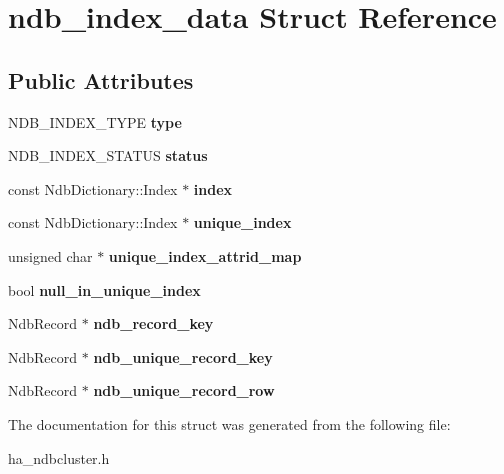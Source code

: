 \hypertarget{structndb__index__data}{}\section{ndb\+\_\+index\+\_\+data Struct Reference}
\label{structndb__index__data}
\subsection*{Public Attributes}
\begin{DoxyCompactItemize}
\item 
\mbox{\label{structndb__index__data_a3dbfb860106adeb20ff94dc96f12f490}} 
N\+D\+B\+\_\+\+I\+N\+D\+E\+X\+\_\+\+T\+Y\+PE {\bfseries type}
\item 
\mbox{\label{structndb__index__data_a23e562bc1549fb58196c704acba2a59f}} 
N\+D\+B\+\_\+\+I\+N\+D\+E\+X\+\_\+\+S\+T\+A\+T\+US {\bfseries status}
\item 
\mbox{\label{structndb__index__data_ac62a8cd0e83bcbac5164184ba6233a3a}} 
const Ndb\+Dictionary\+::\+Index $\ast$ {\bfseries index}
\item 
\mbox{\label{structndb__index__data_a0356a02115f2e176c3e1bf0da18e6a58}} 
const Ndb\+Dictionary\+::\+Index $\ast$ {\bfseries unique\+\_\+index}
\item 
\mbox{\label{structndb__index__data_a7b33611f8398053f1c9dcfd75b4f3523}} 
unsigned char $\ast$ {\bfseries unique\+\_\+index\+\_\+attrid\+\_\+map}
\item 
\mbox{\label{structndb__index__data_ac1a04ce2d4eda90074f60c2b00ad0938}} 
bool {\bfseries null\+\_\+in\+\_\+unique\+\_\+index}
\item 
\mbox{\label{structndb__index__data_a6c5fc9bc4c229b27e2cb76558ca1b5a8}} 
Ndb\+Record $\ast$ {\bfseries ndb\+\_\+record\+\_\+key}
\item 
\mbox{\label{structndb__index__data_a2b3a3148f82971344e42eb64996eea5c}} 
Ndb\+Record $\ast$ {\bfseries ndb\+\_\+unique\+\_\+record\+\_\+key}
\item 
\mbox{\label{structndb__index__data_a3315594fe406e8cf98a64ea605767b0e}} 
Ndb\+Record $\ast$ {\bfseries ndb\+\_\+unique\+\_\+record\+\_\+row}
\end{DoxyCompactItemize}


The documentation for this struct was generated from the following file\+:\begin{DoxyCompactItemize}
\item 
ha\+\_\+ndbcluster.\+h\end{DoxyCompactItemize}
